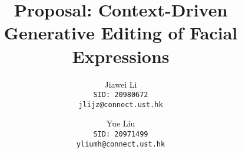 \documentclass[10pt,twocolumn,letterpaper]{article}
\begin{document}
\title{Proposal: Context-Driven Generative Editing of Facial Expressions}



\author{Jiawei Li\\
{\tt\small SID: 20980672}\\
{\tt\small jlijz@connect.ust.hk}
\and
Yue Liu\\
{\tt\small SID: 20971499} \\
{\tt\small yliumh@connect.ust.hk}
}

\maketitle
\ificcvfinal\thispagestyle{empty}\fi



% 
% 
% 
% 
% 




\end{document}
